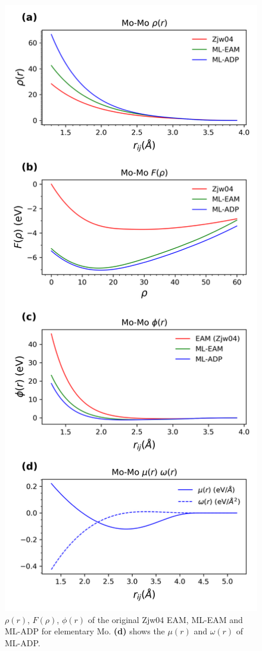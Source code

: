 \documentclass[prb,reprint,superscriptaddress]{revtex4-2}
\begin{document}
% 
%
\begin{figure}[htp]
\centering
\includegraphics[scale=0.6]{Mo_eam_adp.png}
\caption{\label{fig:Mo_eam_adp} $\rho(r)$, $F(\rho)$, $\phi(r)$ of the original 
Zjw04 EAM, ML-EAM and ML-ADP for elementary Mo. \textbf{(d)} shows the $\mu(r)$ 
and $\omega(r)$ of ML-ADP.}
\end{figure}
\end{document}
